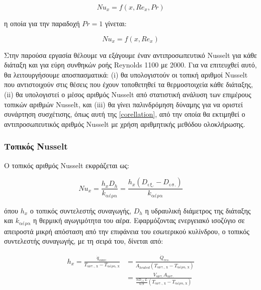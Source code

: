 \begin{equation*}
{Nu}_x = f\left(x, {Re}_x, Pr\right)
\end{equation*}

\noindent η οποία για την παραδοχή $Pr = 1$ γίνεται:

\begin{equation}\label{corellation}
{Nu}_x = f\left(x, {Re}_x\right)
\end{equation}

\noindent Στην παρούσα εργασία θέλουμε να εξάγουμε έναν αντιπροσωπευτικό Nusselt για κάθε διάταξη και για εύρη συνθηκών ροής Reynolds 1100 με 2000. Για να επιτευχθεί αυτό, θα λειτουργήσουμε αποσπασματικά: (i) θα υπολογιστούν οι τοπική αριθμοί Nusselt που αντιστοιχούν στις θέσεις που έχουν τοποθετηθεί τα θερμοστοιχεία κάθε διάταξης, (ii) θα υπολογιστεί ο μέσος αριθμός Nusselt από στατιστική ανάλυση των επιμέρους τοπικών αριθμών Nusselt, και (iii) θα γίνει παλινδρόμηση δύναμης για να οριστεί συνάρτηση συσχέτισης, όπως αυτή της \ref{corellation}, από την οποία θα εκτιμηθεί ο αντιπροσωπευτικός αριθμός Nusselt με χρήση αριθμητικής μεθόδου ολοκλήρωσης.

\subsubsection{Τοπικός Nusselt}
\noindent Ο τοπικός αριθμός Nusselt εκφράζεται ως:

\begin{equation}\label{eq:localnusselt}
Nu_x = \displaystyle\frac{h_x D_h}{k_{\text{αέρα}}} = \displaystyle\frac{h_x \left(D_{\text{εξ.}} - D_{\text{εσ.}}\right)}{k_{\text{αέρα}}} 
\end{equation}

\noindent όπου $h_x$ ο τοπικός συντελεστής συναγωγής, $D_h$ η υδραυλική διάμετρος της διάταξης και $k_{\text{αέρα}}$ η θερμική αγωγιμότητα του αέρα. Εφαρμόζοντας ενεργειακό ισοζύγιο σε απειροστά μικρή απόσταση από την επιφάνεια του εσωτερικού κυλίνδρου, ο τοπικός συντελεστής συναγωγής, με τη σειρά του, δίνεται από:

\begin{align}\label{eq:localhtc}
h_x = \displaystyle\frac{\dot{q}_{conv.}}{T_{\text{αντ., x}} - T_{\text{αέρα, x}}} &= \displaystyle\frac{\dot{Q}_{res.}}{A_{heated} \left(T_{\text{αντ., x}} - T_{\text{αέρα, x}}\right)} \nonumber\\[2pt] &= \displaystyle\frac{V_{\text{αντ.}} Α_{\text{αντ.}}}{\displaystyle\frac{\pi D_{\text{εσ.}} L}{0.9} \left(T_{\text{αντ., x}} - T_{\text{αέρα, x}}\right)}
\end{align}


